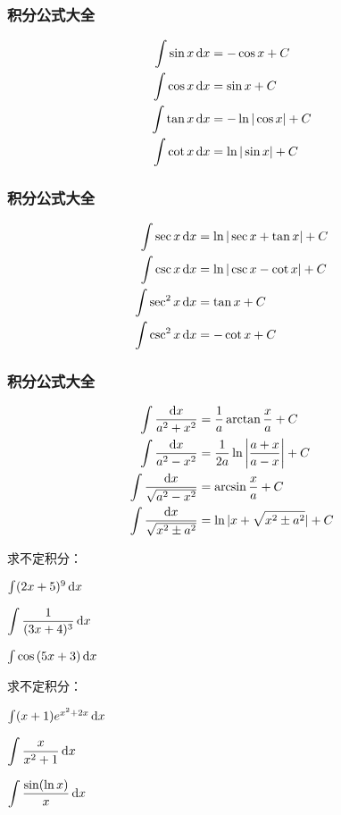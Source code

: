 \documentclass[14pt,notheorems,leqno,xcolor={rgb}]{beamer} %
\begin{document}
\begin{frame}
\frametitle{积分公式大全}
\noindent
\begin{align}
\int \sin x \mathop{}\!\mathrm{d}{x} &= - \cos x + C \\
\int \cos x \mathop{}\!\mathrm{d}{x} &= \sin x + C \\
\int \tan x \mathop{}\!\mathrm{d}{x} &= -\ln|\cos x| + C \\
\int \cot x \mathop{}\!\mathrm{d}{x} &= \ln|\sin x| + C
\end{align}
\end{frame}

\begin{frame}
\frametitle{积分公式大全}
\noindent
\begin{align}
\int \sec x \mathop{}\!\mathrm{d}{x} &= \ln|\sec x + \tan x| + C \\
\int \csc x \mathop{}\!\mathrm{d}{x} &= \ln|\csc x - \cot x| + C \\
\int \sec^2 x \mathop{}\!\mathrm{d}{x} &= \tan x + C \\
\int \csc^2 x \mathop{}\!\mathrm{d}{x} &= -\cot x + C
\end{align}
\end{frame}

\begin{frame}
\frametitle{积分公式大全}
\noindent
\begin{align}
 \int \frac{\mathop{}\!\mathrm{d}{x}}{a^2+x^2} &= \dfrac1a\arctan \dfrac{x}a + C \\
 \int \frac{\mathop{}\!\mathrm{d}{x}}{a^2-x^2} &= \dfrac1{2a}\ln \left|\dfrac{a+x}{a-x}\right| + C\\
 \int \frac{\mathop{}\!\mathrm{d}{x}}{\sqrt{a^2-x^2}} &= \arcsin \dfrac{x}a + C \\
 \int \frac{\mathop{}\!\mathrm{d}{x}}{\sqrt{x^2 \pm a^2}} &= \ln|x+\sqrt{x^2 \pm a^2}| + C
\end{align}
\end{frame}


\begin{frame}
\begin{review}
求不定积分：
\begin{enumlite}
  \item $\int (2x+5)^9 \mathop{}\!\mathrm{d} x$
  \item $\Int\dfrac{1}{(3x+4)^3}\dx$\pause
  \item $\int \cos{(5x+3)}\mathop{}\!\mathrm{d} x$
\end{enumlite}
\end{review}
\end{frame}

\begin{frame}
\begin{review}
求不定积分：
\begin{enumlite}
  \item $\int (x+1)e^{x^2+2x} \mathop{}\!\mathrm{d} x$
  \item $\Int\dfrac{x}{x^2+1}\d x$\pause
  \item $\Int\dfrac{\sin(\ln x)}{x}\d x$
\end{enumlite}
\end{review}
\end{frame}
\end{document}
